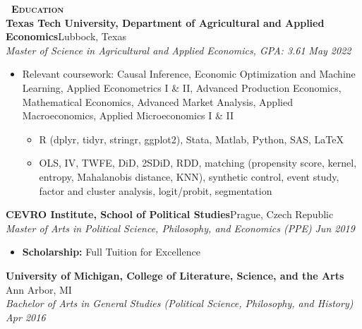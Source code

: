 \documentclass[a4paper,11pt]{article}
\newcommand{\header} [1] {
    \vspace{0.5mm}
    {\textsc{\textbf{\large{\xrfill[0.5ex]{0.5pt}~#1~\xrfill[0.5ex]{0.5pt}}}}} %
}
\begin{document}
\header{Education} \\
\vspace{0.5mm}
\textbf{Texas Tech University, Department of Agricultural and Applied Economics}\hfill Lubbock, Texas\\
\textit{Master of Science in Agricultural and Applied Economics, GPA: 3.61} \hfill  \textit{May 2022} \\
\begin{itemize}
    \item Relevant coursework: Causal Inference, Economic Optimization and Machine Learning, Applied Econometrics I \& II, Advanced Production Economics, Mathematical Economics, Advanced Market Analysis, Applied Macroeconomics, Applied Microeconomics I \& II
    \begin{itemize}
        \item R (dplyr, tidyr, stringr, ggplot2), Stata, Matlab, Python, SAS, \LaTeX
        \item OLS, IV, TWFE, DiD, 2SDiD, RDD, matching (propensity score, kernel, entropy, Mahalanobis distance,  KNN), synthetic control, event study, factor and cluster analysis, logit/probit, segmentation
    \end{itemize}
\end{itemize}
\vspace{0.5mm}

\textbf{CEVRO Institute, School of Political Studies}\hfill Prague, Czech Republic\\
\textit{Master of Arts in Political Science, Philosophy, and Economics (PPE)} \hfill  \textit{Jun 2019}\\
\begin{itemize}
    \item \textbf{Scholarship:} Full Tuition for Excellence
\end{itemize}
\vspace{0.5mm}

\textbf{University of Michigan, College of Literature, Science, and the Arts} \hfill Ann Arbor, MI\\
\textit{Bachelor of Arts in General Studies (Political Science, Philosophy, and History)} \hfill  \textit{Apr 2016}\\

\vspace{0.5mm}
\end{document}
